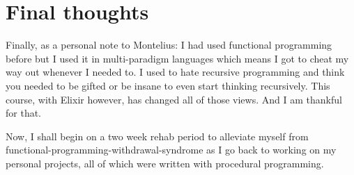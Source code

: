 \section{Final thoughts}
Finally, as a personal note to Montelius: I had used functional programming before but I used it in multi-paradigm languages which means I got to cheat my way out whenever I needed to. I used to hate recursive programming and think you needed to be gifted or be insane to even start thinking recursively. This course, with Elixir however, has changed all of those views. And I am thankful for that.

Now, I shall begin on a two week rehab period to alleviate myself from functional-programming-withdrawal-syndrome as I go back to working on my personal projects, all of which were written with procedural programming.
